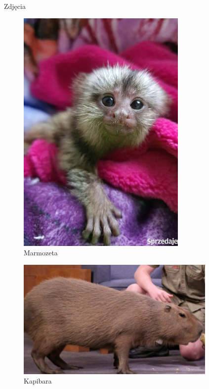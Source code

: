 \documentclass[hyperref={colorlinks = true,linkcolor = black}]{beamer}
\begin{document}
\begin{frame}{Zdjęcia}
\begin{figure}[h]
\includegraphics[scale=0.12]{marmozeta.png}
\caption{Marmozeta}
\label{fig:obr4}
\end{figure}

\begin{figure}[h]
\includegraphics[scale=0.15]{kapibara.png}
\caption{Kapibara}
\label{fig:obr5}
\end{figure}
\end{frame}
\end{document}
